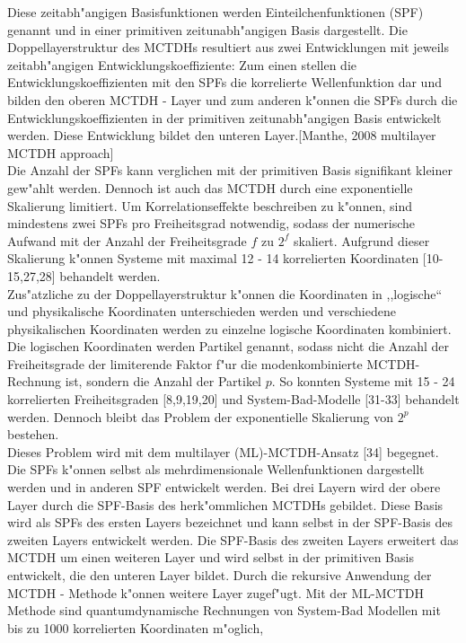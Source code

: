 Diese zeitabh"angigen Basisfunktionen werden Einteilchenfunktionen (SPF) genannt und in einer primitiven zeitunabh"angigen Basis dargestellt.
Die Doppellayerstruktur des MCTDHs resultiert aus zwei Entwicklungen mit jeweils zeitabh"angigen Entwicklungskoeffiziente:
Zum einen stellen die Entwicklungskoeffizienten mit den SPFs die korrelierte Wellenfunktion dar und bilden den oberen MCTDH -
Layer und zum anderen k"onnen die SPFs durch die Entwicklungskoeffizienten in der primitiven zeitunabh"angigen Basis entwickelt werden. Diese Entwicklung bildet
den unteren Layer.[Manthe, 2008 multilayer MCTDH approach]
  \\ Die Anzahl der SPFs kann verglichen mit der primitiven Basis signifikant kleiner gew"ahlt werden.
Dennoch ist auch das MCTDH durch eine exponentielle Skalierung limitiert.
Um Korrelationseffekte beschreiben zu k"onnen, sind mindestens zwei SPFs pro Freiheitsgrad notwendig, sodass der numerische Aufwand mit der Anzahl der
Freiheitsgrade $f$ zu $2^f$ skaliert. Aufgrund dieser Skalierung k"onnen Systeme mit maximal 12 - 14 korrelierten Koordinaten [10-15,27,28] behandelt werden.
  \\ Zus"atzliche zu der Doppellayerstruktur k"onnen die Koordinaten in ,,logische`` und physikalische Koordinaten unterschieden werden und
verschiedene physikalischen Koordinaten werden zu einzelne logische Koordinaten kombiniert. Die logischen Koordinaten werden Partikel genannt, sodass
nicht die Anzahl der Freiheitsgrade der limiterende Faktor f"ur die modenkombinierte MCTDH-Rechnung ist,
sondern die Anzahl der Partikel $p$. So konnten Systeme mit 15 - 24 korrelierten Freiheitsgraden [8,9,19,20] und System-Bad-Modelle [31-33] behandelt werden.
Dennoch bleibt das Problem der exponentielle Skalierung von $2^p$ bestehen.
  \\Dieses Problem wird mit dem multilayer (ML)-MCTDH-Ansatz [34] begegnet.
Die SPFs k"onnen selbst als mehrdimensionale Wellenfunktionen dargestellt werden und in anderen SPF entwickelt werden.
Bei drei Layern wird der obere Layer durch die SPF-Basis des herk"ommlichen MCTDHs gebildet.
Diese Basis wird als SPFs des ersten Layers bezeichnet und kann selbst in der SPF-Basis des zweiten Layers entwickelt werden.
Die SPF-Basis des zweiten Layers erweitert das MCTDH um einen weiteren Layer und wird selbst in der primitiven Basis entwickelt, die den unteren Layer bildet.
Durch die rekursive Anwendung der MCTDH - Methode k"onnen weitere Layer zugef"ugt.
Mit der ML-MCTDH Methode sind quantumdynamische Rechnungen von System-Bad Modellen mit bis zu 1000 korrelierten Koordinaten m"oglich,
